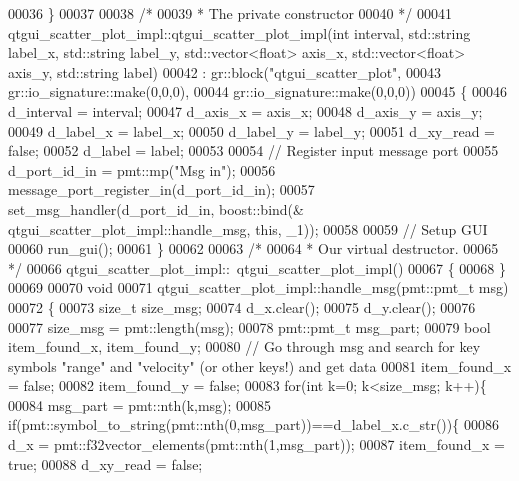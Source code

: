 \begin{DoxyCode}
00036     \}
00037 
00038     \textcolor{comment}{/*}
00039 \textcolor{comment}{     * The private constructor}
00040 \textcolor{comment}{     */}
00041     qtgui_scatter_plot_impl::qtgui_scatter_plot_impl(\textcolor{keywordtype}{int} interval, std::string label\_x, 
      std::string label\_y, std::vector<float> axis\_x, std::vector<float> axis\_y, 
      std::string label)
00042       : gr::block(\textcolor{stringliteral}{"qtgui\_scatter\_plot"},
00043               gr::io\_signature::make(0,0,0),
00044               gr::io\_signature::make(0,0,0))
00045     \{
00046         d_interval = interval;
00047         d_axis_x = axis\_x;
00048         d_axis_y = axis\_y;
00049         d_label_x = label\_x;
00050         d_label_y = label\_y;
00051         d_xy_read = \textcolor{keyword}{false};
00052         d_label = label;
00053         
00054         \textcolor{comment}{// Register input message port}
00055         d_port_id_in = pmt::mp(\textcolor{stringliteral}{"Msg in"});
00056         message\_port\_register\_in(d_port_id_in);
00057         set\_msg\_handler(d_port_id_in, boost::bind(&
      qtgui_scatter_plot_impl::handle_msg, \textcolor{keyword}{this}, \_1));
00058         
00059         \textcolor{comment}{// Setup GUI}
00060         run_gui();
00061     \}
00062 
00063     \textcolor{comment}{/*}
00064 \textcolor{comment}{     * Our virtual destructor.}
00065 \textcolor{comment}{     */}
00066     qtgui_scatter_plot_impl::~qtgui_scatter_plot_impl()
00067     \{
00068     \}
00069     
00070     \textcolor{keywordtype}{void}
00071     qtgui_scatter_plot_impl::handle_msg(pmt::pmt\_t msg)
00072     \{
00073         \textcolor{keywordtype}{size\_t} size\_msg;
00074         d_x.clear();
00075         d_y.clear();
00076         
00077         size\_msg = pmt::length(msg);
00078         pmt::pmt\_t msg\_part;
00079         \textcolor{keywordtype}{bool} item\_found\_x, item\_found\_y;
00080         \textcolor{comment}{// Go through msg and search for key symbols "range" and "velocity" (or other keys!) and get data}
00081         item\_found\_x = \textcolor{keyword}{false};
00082         item\_found\_y = \textcolor{keyword}{false};
00083         \textcolor{keywordflow}{for}(\textcolor{keywordtype}{int} k=0; k<size\_msg; k++)\{
00084             msg\_part = pmt::nth(k,msg);
00085             \textcolor{keywordflow}{if}(pmt::symbol\_to\_string(pmt::nth(0,msg\_part))==d_label_x.c\_str())\{
00086                 d_x = pmt::f32vector\_elements(pmt::nth(1,msg\_part));
00087                 item\_found\_x = \textcolor{keyword}{true};
00088                 d_xy_read = \textcolor{keyword}{false};

\end{DoxyCode}
